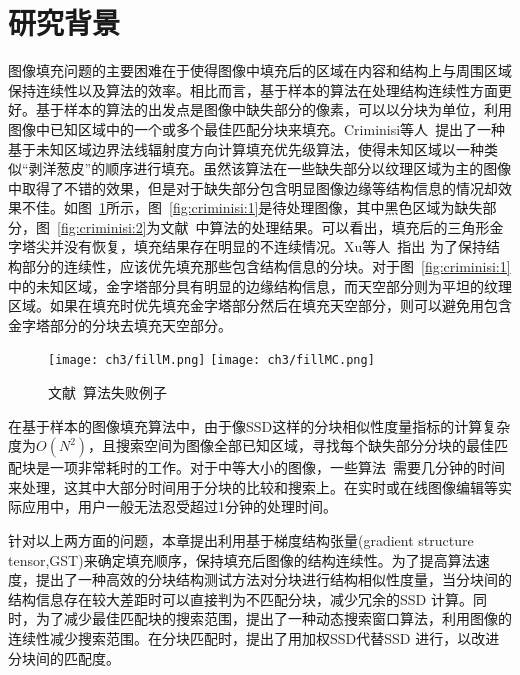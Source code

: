  \section{研究背景}
 \label{ch3:sec:background}
 图像填充问题的主要困难在于使得图像中填充后的区域在内容和结构上与周围区域保持连续性以及算法的效率。相比而言，基于样本的算法在处理结构连续性方面更好。基于样本的算法的出发点是图像中缺失部分的像素，可以以分块为单位，利用图像中已知区域中的一个或多个最佳匹配分块来填充。Criminisi等人~\cite{Criminisi04regionfilling}提出了一种基于未知区域边界法线辐射度方向计算填充优先级算法，使得未知区域以一种类似``剥洋葱皮''的顺序进行填充。虽然该算法在一些缺失部分以纹理区域为主的图像中取得了不错的效果，但是对于缺失部分包含明显图像边缘等结构信息的情况却效果不佳。如图~\ref{fig:criminisi}所示，图~\ref{fig:criminisi:1}是待处理图像，其中黑色区域为缺失部分，图~\ref{fig:criminisi:2}为文献~中算法的处理结果。可以看出，填充后的三角形金字塔尖并没有恢复，填充结果存在明显的不连续情况。Xu等人~\cite{Xu:2010}指出 为了保持结构部分的连续性，应该优先填充那些包含结构信息的分块。对于图~\ref{fig:criminisi:1}中的未知区域，金字塔部分具有明显的边缘结构信息，而天空部分则为平坦的纹理区域。如果在填充时优先填充金字塔部分然后在填充天空部分，则可以避免用包含金字塔部分的分块去填充天空部分。\par
 \begin{figure}[htb]
   \centering%
     {\texttt{[image: ch3/fillM.png]}}%
  \hspace{1em}%
       {\texttt{[image: ch3/fillMC.png]}}
   \caption{文献~算法失败例子}
   \label{fig:criminisi}
 \end{figure}
 在基于样本的图像填充算法中，由于像SSD这样的分块相似性度量指标的计算复杂度为$O(N^2)$，且搜索空间为图像全部已知区域，寻找每个缺失部分分块的最佳匹配块是一项非常耗时的工作。对于中等大小的图像，一些算法~\cite{Xu:2010}需要几分钟的时间来处理，这其中大部分时间用于分块的比较和搜索上。在实时或在线图像编辑等实际应用中，用户一般无法忍受超过1分钟的处理时间。\par
 针对以上两方面的问题，本章提出利用基于梯度结构张量(gradient structure tensor,GST)来确定填充顺序，保持填充后图像的结构连续性。为了提高算法速度，提出了一种高效的分块结构测试方法对分块进行结构相似性度量，当分块间的结构信息存在较大差距时可以直接判为不匹配分块，减少冗余的SSD 计算。同时，为了减少最佳匹配块的搜索范围，提出了一种动态搜索窗口算法，利用图像的连续性减少搜索范围。在分块匹配时，提出了用加权SSD代替SSD 进行，以改进分块间的匹配度。
